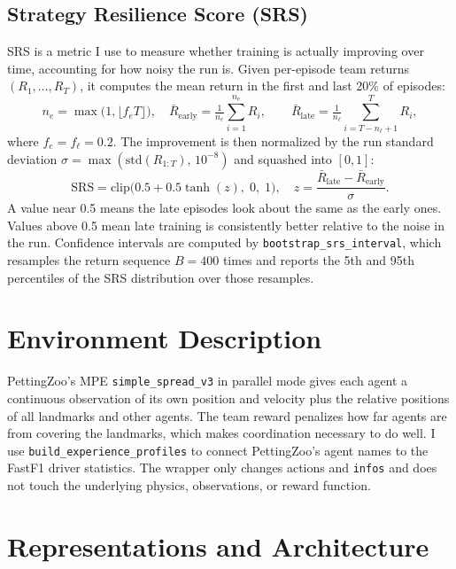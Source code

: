 \documentclass[11pt]{article}
\begin{document}
\subsection*{Strategy Resilience Score (SRS)}
SRS is a metric I use to measure whether training is actually improving over time,
accounting for how noisy the run is. Given per-episode team returns $(R_1,\ldots,R_T)$,
it computes the mean return in the first and last 20\% of episodes:
\[
    n_e = \max\!\bigl(1,\lfloor f_e T\rfloor\bigr),\quad
    \bar{R}_{\mathrm{early}} = \tfrac{1}{n_e}\sum_{i=1}^{n_e} R_i,\qquad
    \bar{R}_{\mathrm{late}} = \tfrac{1}{n_\ell}\sum_{i=T-n_\ell+1}^{T} R_i,
\]
where $f_e = f_\ell = 0.2$. The improvement is then normalized by the run standard
deviation $\sigma = \max(\mathrm{std}(R_{1:T}),\, 10^{-8})$ and squashed into $[0,1]$:
\begin{equation}
    \mathrm{SRS} = \mathrm{clip}\!\bigl(0.5 + 0.5\tanh(z),\; 0,\; 1\bigr),
    \quad z = \frac{\bar{R}_{\mathrm{late}} - \bar{R}_{\mathrm{early}}}{\sigma}.
    \label{eq:srs}
\end{equation}
A value near 0.5 means the late episodes look about the same as the early ones. Values
above 0.5 mean late training is consistently better relative to the noise in the run.
Confidence intervals are computed by \texttt{bootstrap\_srs\_interval}, which resamples
the return sequence $B = 400$ times and reports the 5th and 95th percentiles of the
SRS distribution over those resamples.

\section{Environment Description}

PettingZoo's MPE \texttt{simple\_spread\_v3} in parallel mode gives each agent a
continuous observation of its own position and velocity plus the relative positions of
all landmarks and other agents. The team reward penalizes how far agents are from
covering the landmarks, which makes coordination necessary to do well. I use
\texttt{build\_experience\_profiles} to connect PettingZoo's agent names to the
FastF1 driver statistics. The wrapper only changes actions and \texttt{infos} and does
not touch the underlying physics, observations, or reward function.

\section{Representations and Architecture}
\end{document}

